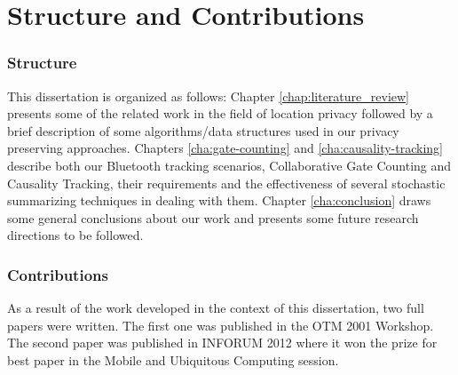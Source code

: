 \section{Structure and Contributions}
\label{sec:structure}

\subsubsection{Structure}
\label{sec:structure} This dissertation is organized as follows:
Chapter \ref{chap:literature_review} presents some of the related work
in the field of location privacy followed by a brief description of
some algorithms/data structures used in our privacy preserving
approaches. Chapters \ref{cha:gate-counting} and
\ref{cha:causality-tracking} describe both our Bluetooth tracking
scenarios, Collaborative Gate Counting and Causality Tracking, their
requirements and the effectiveness of several stochastic summarizing
techniques in dealing with them. Chapter \ref{cha:conclusion} draws
some general conclusions about our work and presents some future
research directions to be followed.

\subsubsection{Contributions}
\label{sec:contributions}
As a result of the work developed in the context of this
dissertation, two full papers were written. The first one
\cite{gonccalves2011privacy} was published in the OTM 2001 Workshop.
The second paper \cite{inforum2012} was published in INFORUM 2012
where it won the prize for best paper in the Mobile and Ubiquitous
Computing session.

